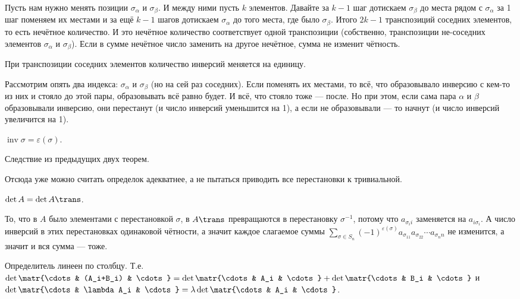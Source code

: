 \documentclass{article}
\begin{document}
\begin{itemize}
        \begin{Proof}
            Пусть нам нужно менять позиции $\sigma_\alpha$ и $\sigma_\beta$. И между ними пусть $k$ элементов. Давайте за $k-1$ шаг дотискаем $\sigma_\beta$ до места рядом с $\sigma_\alpha$ за 1 шаг поменяем их местами и за ещё $k-1$ шагов дотискаем $\sigma_\alpha$ до того места, где было $\sigma_\beta$. Итого $2k-1$ транспозиций соседних элементов, то есть нечётное количество. И это нечётное количество соответствует одной транспозиции (собственно, транспозиции не-соседних элементов $\sigma_\alpha$ и $\sigma_\beta$). Если в сумме нечётное число заменить на другое нечётное, сумма не изменит чётность.
        \end{Proof}
        \thm При транспозиции соседних элементов количество инверсий меняется на единицу.
        \begin{Proof}
            Рассмотрим опять два индекса: $\sigma_\alpha$ и $\sigma_\beta$ (но на сей раз соседних). Если поменять их местами, то всё, что образовывало инверсию с кем-то из них и стояло до этой пары, образовывать всё равно будет. И всё, что стояло тоже --- после. Но при этом, если сама пара $\alpha$ и $\beta$ образовывали инверсию, они перестанут (и число инверсий уменьшится на 1), а если не образовывали --- то начнут (и число инверсий увеличится на 1).
        \end{Proof}
        \thm $\operatorname{inv}\sigma=\varepsilon(\sigma)$.
        \begin{Proof}
            Следствие из предыдущих двух теорем.
        \end{Proof}
        \begin{Comment}
            Отсюда уже можно считать определок адекватнее, а не пытаться приводить все перестановки к тривиальной.
        \end{Comment}
        \thm $\det A=\det A\trans$.
        \begin{Proof}
            То, что в $A$ было элементами с перестановкой $\sigma$, в $A\trans$ превращаются в перестановку $\sigma^{-1}$, потому что $a_{\sigma_ii}$ заменяется на $a_{i\sigma_i}$. А число инверсий в этих перестановках одинаковой чётности, а значит каждое слагаемое суммы $\sum\limits_{\sigma\in S_n}(-1)^{\varepsilon(\sigma)}a_{\sigma_11}a_{\sigma_22}\cdots a_{\sigma_nn}$ не изменится, а значит и вся сумма --- тоже.
        \end{Proof}
        \thm Определитель линеен по столбцу. Т.е. $\det\matr{\cdots & (A_i+B_i) & \cdots}=\det\matr{\cdots & A_i & \cdots}+\det\matr{\cdots & B_i & \cdots}$ и $\det\matr{\cdots & \lambda A_i & \cdots}=\lambda\det\matr{\cdots & A_i & \cdots}$.

\end{itemize}
\end{document}
